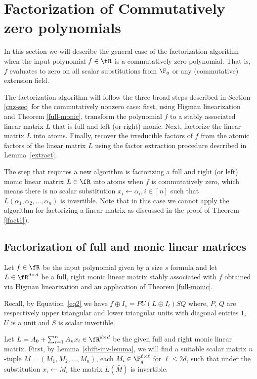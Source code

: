 %
\section{Factorization of Commutatively zero polynomials}\label{cz-sec}

In this section we will describe the general case of the factorization
algorithm when the input polynomial $f\in\fR$ is a commutatively zero
polynomial. That is, $f$ evaluates to zero on all scalar substitutions
from $\F_q$ or any (commutative) extension field.

%
%
%

The factorization algorithm will follow the three broad steps
described in Section \ref{cnz-sec} for the commutatively nonzero case:
first, using Higman linearization and Theorem \ref{full-monic},
transform the polynomial $f$ to a stably associated linear matrix $L$
that is full and left (or right) monic. Next, factorize the linear
matrix $L$ into atoms. Finally, recover the irreducible factors of $f$
from the atomic factors of the linear matrix $L$ using the factor
extraction procedure described in Lemma~\ref{extract}.

The step that requires a new algorithm is factorizing a full and right (or left)
monic linear matrix $L\in\fR$ into atoms when $f$ is commutatively
zero, which means there is no scalar substitution $x_i\leftarrow
\alpha_i, i\in[n]$ such that $L(\alpha_1,\alpha_2,\ldots,\alpha_n)$ is
invertible. Note that in this case we cannot apply the algorithm for
factorizing a linear matrix as discussed in the proof of Theorem
\ref{lfact1}).

\subsection{Factorization of full and monic linear matrices}

Let $f\in \fR$ be the input polynomial given by a size $s$ formula and
let $L \in\fR^{d\times d}$ be a full, right monic linear matrix stably
associated with $f$ obtained via Higman linearization and an
application of Theorem \ref{full-monic}.

Recall, by Equation~\ref{eq2} we have $f \oplus I_s= PU(L \oplus
I_t)SQ$ where, $P$, $Q$ are respectively upper triangular and lower
triangular units with diagonal entries $1$, $U$ is a unit and $S$ is
scalar invertible. 

%
%
%
%
%
%

Let $L=A_0+\sum_{i=1}^n A_n x_i\in\fR^{d\times d}$ be the given full
and right monic linear matrix.  First, by Lemma~\ref{shift-inv-lemma},
we will find a suitable scalar matrix $n$-tuple
$\bar{M}=(M_1,M_2,\ldots,M_n)$, each $M_i\in \F_q^{\ell\times \ell}$
for $\ell\le 2d$, such that under the substitution $x_i\leftarrow M_i$
the matrix $L(\bar{M})$ is invertible.


